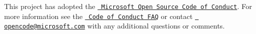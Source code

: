 This project has adopted the \href{https://opensource.microsoft.com/codeofconduct/}{\texttt{ Microsoft Open Source Code of Conduct}}. For more information see the \href{https://opensource.microsoft.com/codeofconduct/faq/}{\texttt{ Code of Conduct F\+AQ}} or contact \href{mailto:opencode@microsoft.com}{\texttt{ opencode@microsoft.\+com}} with any additional questions or comments. 